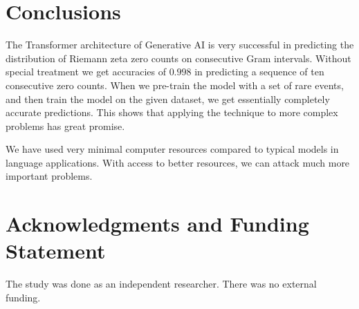 \documentclass[twoside]{article}
\begin{document}
\section{\label{conclusions}Conclusions}
The Transformer architecture of Generative AI is very successful in predicting the distribution of Riemann zeta zero counts on consecutive Gram intervals. Without special treatment we get accuracies of $0.998$
in predicting a sequence of ten consecutive zero counts. When we pre-train the model with a set of rare events, and then train the model on the given dataset, we get essentially completely accurate predictions.
 This shows that applying the technique to more complex problems has great promise. 

We have used very minimal computer resources compared to typical models in language applications. With access to better resources, we can attack much more important problems.

\section*{Acknowledgments and Funding Statement}

 The study was done as an independent researcher. There was no
external funding.
\end{document}
